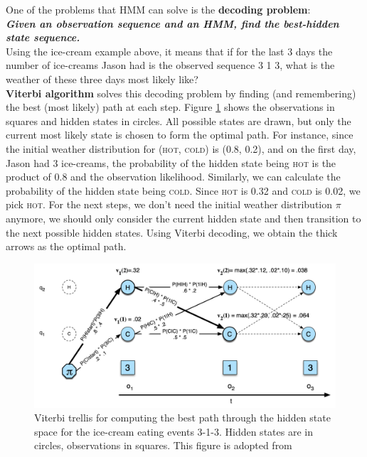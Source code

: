 \documentclass[nobib]{tufte-handout}
\begin{document}
One of the problems that HMM can solve is the \textbf{decoding problem}:\\
\bigskip
\textbf{\textit{Given an observation sequence and an HMM, find the best-hidden state sequence.}}\\
\bigskip
Using the ice-cream example above, it means that if for the last 3 days the number of ice-creams Jason had is the observed sequence 3 1 3, what is the weather of these three days most likely like?\\
\textbf{Viterbi algorithm} solves this decoding problem by finding (and remembering) the best (most likely) path at each step. Figure \ref{fig:vi} shows the observations in squares and hidden states in circles. All possible states are drawn, but only the current most likely state is chosen to form the optimal path. For instance, since the initial weather distribution for (\textsc{hot}, \textsc{cold}) is (0.8, 0.2), and on the first day, Jason had 3 ice-creams, the probability of the hidden state being \textsc{hot} is the product of 0.8 and the observation likelihood. Similarly, we can calculate the probability of the hidden state being \textsc{cold}. Since \textsc{hot} is 0.32 and \textsc{cold} is 0.02, we pick \textsc{hot}. For the next steps, we don't need the initial weather distribution $\pi$ anymore, we should only consider the current hidden state and then transition to the next possible hidden states. Using Viterbi decoding, we obtain the thick arrows as the optimal path.

\begin{figure}
 \includegraphics[width=1\textwidth]{viterbi.png}
  \caption{Viterbi trellis for computing the best path through the hidden state space for the ice-cream eating events 3-1-3. Hidden states are in circles, observations in squares. This figure is adopted from \cite{slp}}
  \label{fig:vi}
\end{figure}
\end{document}
